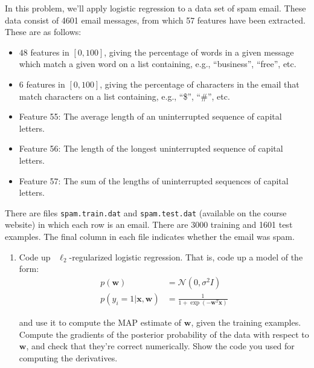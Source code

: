 \documentclass[submit]{harvardml}
\begin{document}
\begin{problem}
In this problem, we'll apply logistic regression to a data set of spam
email.  These data consist of 4601 email messages, from which 57
features have been extracted.  These are as follows:
\begin{itemize}
  \item $48$ features in $[0,100]$, giving the percentage of words in
    a given message which match a given word on a list containing,
    e.g., ``business'', ``free'', etc.
  \item $6$ features in $[0,100]$, giving the percentage of characters
    in the email that match characters on a list containing, e.g.,
    ``\$'', ``\#'', etc.
  \item Feature 55: The average length of an uninterrupted sequence of
    capital letters.
  \item Feature 56: The length of the longest uninterrupted sequence
    of capital letters.
  \item Feature 57: The sum of the lengths of uninterrupted sequences
    of capital letters.
\end{itemize}
There are files \texttt{spam.train.dat} and \texttt{spam.test.dat}
(available on the course website) in which each row is an email.
There are 3000 training and 1601 test examples.  The final column in
each file indicates whether the email was spam.

\begin{enumerate}
  \item Code up ~$\ell_2$-regularized logistic regression.
  That is, code up a model of the form:
  \begin{align}
  p(\mathbf{w}) & = \mathcal{N}(0, \sigma^2 I) \\
  p(y_i = 1 | \mathbf{x}, \mathbf{w}) & = \frac{1}{1 + \exp(-\mathbf{w}^T \mathbf{x})}
  \end{align}

  and use it to compute the MAP estimate of $\mathbf{w}$, given the training examples.
  Compute the gradients of the posterior probability of the data with respect to $\mathbf{w}$, and check that they're correct numerically.
  Show the code you used for computing the derivatives.


\end{enumerate}
\end{problem}
\end{document}
